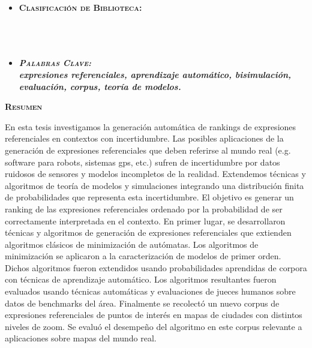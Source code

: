 \thispagestyle{empty}

\begin{itemize}
	\item \textbf{\textsc{Clasificaci\'on de Biblioteca:}} \\ \\  \\ \\

	\item \textbf{\emph{\textsc{Palabras Clave:} \\ expresiones referenciales, aprendizaje autom\'atico, bisimulaci\'on, evaluaci\'on, corpus, teor\'ia de modelos.}}
\end{itemize}

\begin{center}

{ \vspace*{1cm} }
\huge{\textbf{\textsc{\textmd{Resumen}}}}\\[1cm]

\end{center}

\normalsize{


En esta tesis investigamos la generaci\'on autom\'atica de rankings de
expresiones referenciales en contextos con incertidumbre. Las
posibles aplicaciones de la generaci\'on de expresiones referenciales
que deben referirse al mundo real (e.g. software para robots, sistemas
gps, etc.) sufren de incertidumbre por datos ruidosos de sensores y
modelos incompletos de la realidad. Extendemos t\'ecnicas y algoritmos
de teor\'ia de modelos y simulaciones integrando una distribuci\'on finita
de probabilidades que representa esta incertidumbre. El objetivo es
generar un ranking de las expresiones referenciales ordenado por la
probabilidad de ser correctamente interpretada en el contexto. En
primer lugar, se desarrollaron t\'ecnicas y algoritmos de generaci\'on de
expresiones referenciales que extienden algoritmos cl\'asicos de
minimizaci\'on de aut\'omatas. Los algoritmos de minimizaci\'on se aplicaron a la caracterizaci\'on de modelos de
primer orden. Dichos algoritmos fueron extendidos usando
probabilidades aprendidas de corpora con t\'ecnicas de aprendizaje
autom\'atico. Los algoritmos resultantes fueron evaluados usando
t\'ecnicas autom\'aticas y evaluaciones de jueces humanos sobre datos de
benchmarks del \'area. Finalmente se recolect\'o un nuevo corpus de
expresiones referenciales de puntos de inter\'es en mapas de ciudades
con distintos niveles de zoom. Se evalu\'o el desempe\~no del algoritmo en
este corpus relevante a aplicaciones sobre mapas del mundo real.
}

